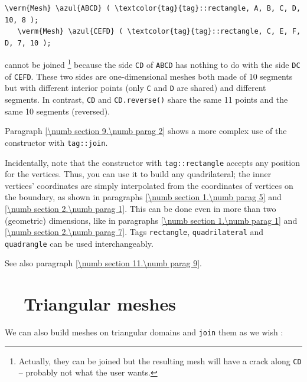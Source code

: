 \begin{Verbatim}[commandchars=\\\{\},formatcom=\small\tt,baselinestretch=0.94]
   \verm{Mesh} \azul{ABCD} ( \textcolor{tag}{tag}::rectangle, A, B, C, D, 10, 8 );
   \verm{Mesh} \azul{CEFD} ( \textcolor{tag}{tag}::rectangle, C, E, F, D, 7, 10 );
\end{Verbatim}

\noindent cannot be joined%
\footnote {Actually, they can be joined but the resulting mesh will have
a crack along {\small\tt CD} -- probably not what the user wants.}
because the side {\small\tt CD} of {\small\tt ABCD} has nothing to do with the side 
{\small\tt DC} of {\small\tt CEFD}.
These two sides are one-dimensional meshes both made of 10 segments but with different
interior points (only {\small\tt C} and {\small\tt D} are shared) and different segments.
In contrast, {\small\tt CD} and {\small\tt CD.reverse()} share the same 11 points and
the same 10 segments (reversed).

Paragraph \ref{\numb section 9.\numb parag 2} shows a more complex use of the {\small\tt {}}
constructor with {\small\tt \textcolor{tag}{tag}::join}.

Incidentally, note that the {\small\tt {}} constructor with {\small\tt \textcolor{tag}{tag}::rectangle} accepts
any position for the vertices. 
Thus, you can use it to build any quadrilateral; the inner vertices' coordinates are simply
interpolated from the coordinates of vertices on the boundary, as shown in paragraphs
\ref{\numb section 1.\numb parag 5} and \ref{\numb section 2.\numb parag 1}.
This can be done even in more than two (geometric) dimensions, like in
paragraphs \ref{\numb section 1.\numb parag 1} and \ref{\numb section 2.\numb parag 7}.
Tags {\small\tt rectangle}, {\small\tt quadrilateral} and {\small\tt quadrangle} can be used
interchangeably.

See also paragraph \ref{\numb section 11.\numb parag 9}.


\section{~~Triangular meshes}\label{\numb section 1.\numb parag 4}

We can also build meshes on triangular domains and {\small\tt join} them as we wish :

